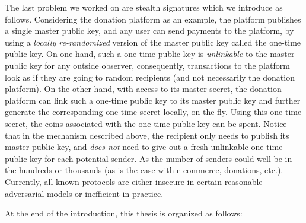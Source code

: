 The last problem we worked on are stealth signatures which we introduce as follows.
Considering the donation platform as an example, the platform publishes a single master public key, and any user can send payments to the platform, by using a \emph{locally re-randomized} version of the master public key called the one-time public key. On one hand, such a one-time public key is \emph{unlinkable} to the master public key for any outside observer, consequently, transactions to the platform look as if they are going to random recipients (and not necessarily the donation platform). On the other hand, with access to its master secret, the donation platform can link such a one-time public key to its master public key and further generate the corresponding one-time secret locally, on the fly. Using this one-time secret, the coins associated with the one-time public key can be spent.
Notice that in the mechanism described above, the recipient only needs to publish its master public key, and \emph{does not} need to give out a fresh unlinkable one-time public key for each potential sender. As the number of senders could well be in the hundreds or thousands (as is the case with e-commerce, donations, etc.).
Currently, all known protocols are either insecure in certain reasonable adversarial models or inefficient in practice.

At the end of the introduction,
this thesis is organized as follows:

